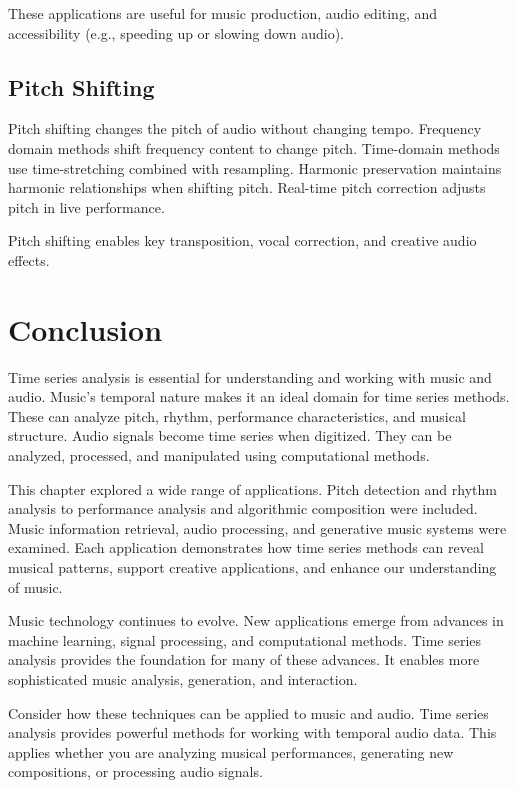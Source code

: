 These applications are useful for music production, audio editing, and accessibility (e.g., speeding up or slowing down audio).

\subsection{Pitch Shifting}

Pitch shifting changes the pitch of audio without changing tempo. Frequency domain methods shift frequency content to change pitch. Time-domain methods use time-stretching combined with resampling. Harmonic preservation maintains harmonic relationships when shifting pitch. Real-time pitch correction adjusts pitch in live performance.

Pitch shifting enables key transposition, vocal correction, and creative audio effects.

\section{Conclusion}

Time series analysis is essential for understanding and working with music and audio. Music's temporal nature makes it an ideal domain for time series methods. These can analyze pitch, rhythm, performance characteristics, and musical structure. Audio signals become time series when digitized. They can be analyzed, processed, and manipulated using computational methods.

This chapter explored a wide range of applications. Pitch detection and rhythm analysis to performance analysis and algorithmic composition were included. Music information retrieval, audio processing, and generative music systems were examined. Each application demonstrates how time series methods can reveal musical patterns, support creative applications, and enhance our understanding of music.

Music technology continues to evolve. New applications emerge from advances in machine learning, signal processing, and computational methods. Time series analysis provides the foundation for many of these advances. It enables more sophisticated music analysis, generation, and interaction.

Consider how these techniques can be applied to music and audio. Time series analysis provides powerful methods for working with temporal audio data. This applies whether you are analyzing musical performances, generating new compositions, or processing audio signals.

